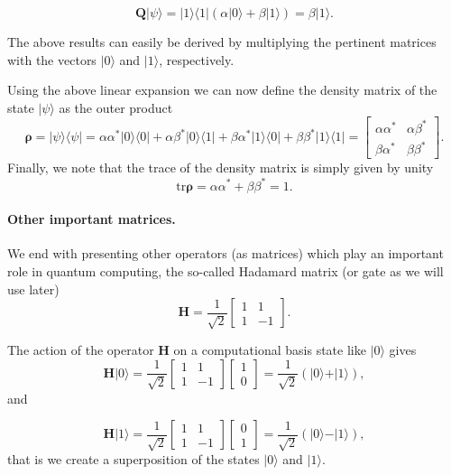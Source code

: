 \[
\bm{Q}\vert \psi \rangle = \vert 1 \rangle\langle 1\vert (\alpha \vert 0 \rangle + \beta\vert 1 \rangle)=\beta \vert 1\rangle.
\]

The above results can easily be derived by multiplying the pertinent
matrices with the vectors $\vert 0\rangle$ and $\vert 1\rangle$,
respectively.

Using the above linear expansion we can now define the density matrix of the state $\vert \psi\rangle$ as the outer product
\[
\bm{\rho}=\vert \psi \rangle\langle \psi \vert = \alpha\alpha^* \vert 0 \rangle\langle 0\vert+\alpha\beta^* \vert 0 \rangle\langle 1\vert+\beta\alpha^* \vert 1 \rangle\langle 0\vert+\beta\beta^* \vert 1 \rangle\langle 1\vert=\begin{bmatrix} \alpha\alpha^* & \alpha\beta^*\\ \beta\alpha^* & \beta\beta^*\end{bmatrix}.
\]
Finally, we note that the trace of the density matrix is simply given by unity
\[
\mathrm{tr}\bm{\rho}=\alpha\alpha^* +\beta\beta^*=1.
\]

\paragraph{Other important matrices.}
We end with presenting other operators (as matrices) which play an important role in quantum computing, the so-called Hadamard matrix (or gate as we will use later)
\[
\bm{H}=\frac{1}{\sqrt{2}}\begin{bmatrix} 1 & 1 \\ 1 & -1\end{bmatrix}.
\]

The action of the operator $\bm{H}$ on a computational basis state like $\vert 0\rangle$ gives
\[
\bm{H}\vert 0 \rangle = \frac{1}{\sqrt{2}}\begin{bmatrix} 1 & 1 \\ 1 & -1\end{bmatrix}\begin{bmatrix} 1 \\ 0\end{bmatrix}=\frac{1}{\sqrt{2}}(\vert 0\rangle + \vert 1\rangle),
\]
and 

\[
\bm{H}\vert 1 \rangle = \frac{1}{\sqrt{2}}\begin{bmatrix} 1 & 1 \\ 1 & -1\end{bmatrix}\begin{bmatrix} 0 \\ 1\end{bmatrix}=\frac{1}{\sqrt{2}}(\vert 0\rangle - \vert 1\rangle),
\]
that is we create a superposition of the states $\vert 0\rangle$ and $\vert 1\rangle$.

